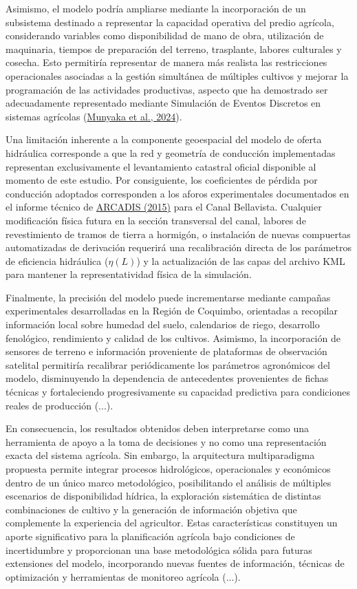 \documentclass[12pt]{report}
\newcommand{\citeref}[2]{\hyperlink{ref:#1}{#2}}
\begin{document}
Asimismo, el modelo podría ampliarse mediante la incorporación de un subsistema destinado a representar la capacidad operativa del predio agrícola, considerando variables como disponibilidad de mano de obra, utilización de maquinaria, tiempos de preparación del terreno, trasplante, labores culturales y cosecha. Esto permitiría representar de manera más realista las restricciones operacionales asociadas a la gestión simultánea de múltiples cultivos y mejorar la programación de las actividades productivas, aspecto que ha demostrado ser adecuadamente representado mediante Simulación de Eventos Discretos en sistemas agrícolas (\citeref{munyaka2024}{Munyaka et al., 2024}).

Una limitación inherente a la componente geoespacial del modelo de oferta hidráulica corresponde a que la red y geometría de conducción implementadas representan exclusivamente el levantamiento catastral oficial disponible al momento de este estudio. Por consiguiente, los coeficientes de pérdida por conducción adoptados corresponden a los aforos experimentales documentados en el informe técnico de \citeref{arcadis2015}{ARCADIS (2015)} para el Canal Bellavista. Cualquier modificación física futura en la sección transversal del canal, labores de revestimiento de tramos de tierra a hormigón, o instalación de nuevas compuertas automatizadas de derivación requerirá una recalibración directa de los parámetros de eficiencia hidráulica ($\eta(L)$) y la actualización de las capas del archivo KML para mantener la representatividad física de la simulación.

Finalmente, la precisión del modelo puede incrementarse mediante campañas experimentales desarrolladas en la Región de Coquimbo, orientadas a recopilar información local sobre humedad del suelo, calendarios de riego, desarrollo fenológico, rendimiento y calidad de los cultivos. Asimismo, la incorporación de sensores de terreno e información proveniente de plataformas de observación satelital permitiría recalibrar periódicamente los parámetros agronómicos del modelo, disminuyendo la dependencia de antecedentes provenientes de fichas técnicas y fortaleciendo progresivamente su capacidad predictiva para condiciones reales de producción (...).

En consecuencia, los resultados obtenidos deben interpretarse como una herramienta de apoyo a la toma de decisiones y no como una representación exacta del sistema agrícola. Sin embargo, la arquitectura multiparadigma propuesta permite integrar procesos hidrológicos, operacionales y económicos dentro de un único marco metodológico, posibilitando el análisis de múltiples escenarios de disponibilidad hídrica, la exploración sistemática de distintas combinaciones de cultivo y la generación de información objetiva que complemente la experiencia del agricultor. Estas características constituyen un aporte significativo para la planificación agrícola bajo condiciones de incertidumbre y proporcionan una base metodológica sólida para futuras extensiones del modelo, incorporando nuevas fuentes de información, técnicas de optimización y herramientas de monitoreo agrícola (...).
\end{document}
